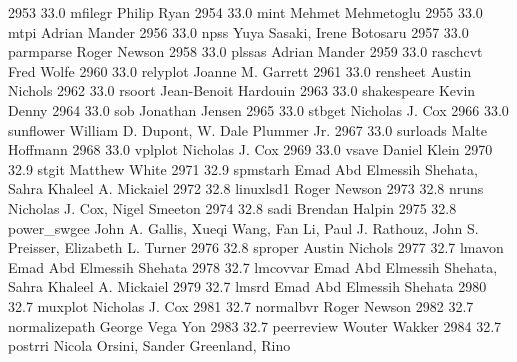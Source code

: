   2953     33.0    mfilegr       Philip Ryan                             
  2954     33.0    mint          Mehmet Mehmetoglu                       
  2955     33.0    mtpi          Adrian Mander                           
  2956     33.0    npss          Yuya Sasaki, Irene Botosaru             
  2957     33.0    parmparse     Roger Newson                            
  2958     33.0    plssas        Adrian Mander                           
  2959     33.0    raschcvt      Fred Wolfe                              
  2960     33.0    relyplot      Joanne M. Garrett                       
  2961     33.0    rensheet      Austin Nichols                          
  2962     33.0    rsoort        Jean-Benoit Hardouin                    
  2963     33.0    shakespeare   Kevin Denny                             
  2964     33.0    sob           Jonathan Jensen                         
  2965     33.0    stbget        Nicholas J. Cox                         
  2966     33.0    sunflower     William D. Dupont, W. Dale Plummer Jr.  
  2967     33.0    surloads      Malte Hoffmann                          
  2968     33.0    vplplot       Nicholas J. Cox                         
  2969     33.0    vsave         Daniel Klein                            
  2970     32.9    stgit         Matthew White                           
  2971     32.9    spmstarh      Emad Abd Elmessih Shehata, Sahra        
                                   Khaleel A. Mickaiel                     
  2972     32.8    linuxlsd1     Roger Newson                            
  2973     32.8    nruns         Nicholas J. Cox, Nigel Smeeton          
  2974     32.8    sadi          Brendan Halpin                          
  2975     32.8    power_swgee   John A. Gallis, Xueqi Wang, Fan Li,     
                                   Paul J. Rathouz, John S. Preisser,      
                                   Elizabeth L. Turner                     
  2976     32.8    sproper       Austin Nichols                          
  2977     32.7    lmavon        Emad Abd Elmessih Shehata               
  2978     32.7    lmcovvar      Emad Abd Elmessih Shehata, Sahra        
                                   Khaleel A. Mickaiel                     
  2979     32.7    lmsrd         Emad Abd Elmessih Shehata               
  2980     32.7    muxplot       Nicholas J. Cox                         
  2981     32.7    normalbvr     Roger Newson                            
  2982     32.7    normalizepath  George Vega Yon                         
  2983     32.7    peerreview    Wouter Wakker                           
  2984     32.7    postrri       Nicola Orsini, Sander Greenland, Rino   
